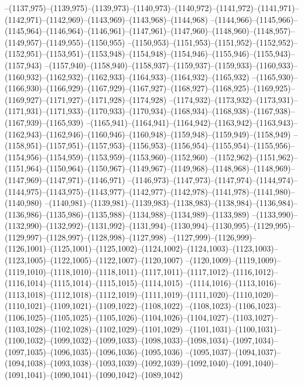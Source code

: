 --(1137,975)--(1139,975)--(1139,973)--(1140,973)--(1140,972)--(1141,972)--(1141,971)--(1142,971)--(1142,969)--(1143,969)--(1143,968)--(1144,968)
--(1144,966)--(1145,966)--(1145,964)--(1146,964)--(1146,961)--(1147,961)--(1147,960)--(1148,960)--(1148,957)--(1149,957)--(1149,955)--(1150,955)
--(1150,953)--(1151,953)--(1151,952)--(1152,952)--(1152,951)--(1153,951)--(1153,948)--(1154,948)--(1154,946)--(1155,946)--(1155,943)--(1157,943)
--(1157,940)--(1158,940)--(1158,937)--(1159,937)--(1159,933)--(1160,933)--(1160,932)--(1162,932)--(1162,933)--(1164,933)--(1164,932)--(1165,932)
--(1165,930)--(1166,930)--(1166,929)--(1167,929)--(1167,927)--(1168,927)--(1168,925)--(1169,925)--(1169,927)--(1171,927)--(1171,928)--(1174,928)
--(1174,932)--(1173,932)--(1173,931)--(1171,931)--(1171,933)--(1170,933)--(1170,934)--(1168,934)--(1168,938)--(1167,938)--(1167,939)--(1165,939)
--(1165,941)--(1164,941)--(1164,942)--(1163,942)--(1163,943)--(1162,943)--(1162,946)--(1160,946)--(1160,948)--(1159,948)--(1159,949)--(1158,949)
--(1158,951)--(1157,951)--(1157,953)--(1156,953)--(1156,954)--(1155,954)--(1155,956)--(1154,956)--(1154,959)--(1153,959)--(1153,960)--(1152,960)
--(1152,962)--(1151,962)--(1151,964)--(1150,964)--(1150,967)--(1149,967)--(1149,968)--(1148,968)--(1148,969)--(1147,969)--(1147,971)--(1146,971)
--(1146,973)--(1147,973)--(1147,974)--(1144,974)--(1144,975)--(1143,975)--(1143,977)--(1142,977)--(1142,978)--(1141,978)--(1141,980)--(1140,980)
--(1140,981)--(1139,981)--(1139,983)--(1138,983)--(1138,984)--(1136,984)--(1136,986)--(1135,986)--(1135,988)--(1134,988)--(1134,989)--(1133,989)
--(1133,990)--(1132,990)--(1132,992)--(1131,992)--(1131,994)--(1130,994)--(1130,995)--(1129,995)--(1129,997)--(1128,997)--(1128,998)--(1127,998)
--(1127,999)--(1126,999)--(1126,1001)--(1125,1001)--(1125,1002)--(1124,1002)--(1124,1003)--(1123,1003)--(1123,1005)--(1122,1005)--(1122,1007)--(1120,1007)
--(1120,1009)--(1119,1009)--(1119,1010)--(1118,1010)--(1118,1011)--(1117,1011)--(1117,1012)--(1116,1012)--(1116,1014)--(1115,1014)--(1115,1015)--(1114,1015)
--(1114,1016)--(1113,1016)--(1113,1018)--(1112,1018)--(1112,1019)--(1111,1019)--(1111,1020)--(1110,1020)--(1110,1021)--(1109,1021)--(1109,1022)--(1108,1022)
--(1108,1023)--(1106,1023)--(1106,1025)--(1105,1025)--(1105,1026)--(1104,1026)--(1104,1027)--(1103,1027)--(1103,1028)--(1102,1028)--(1102,1029)--(1101,1029)
--(1101,1031)--(1100,1031)--(1100,1032)--(1099,1032)--(1099,1033)--(1098,1033)--(1098,1034)--(1097,1034)--(1097,1035)--(1096,1035)--(1096,1036)--(1095,1036)
--(1095,1037)--(1094,1037)--(1094,1038)--(1093,1038)--(1093,1039)--(1092,1039)--(1092,1040)--(1091,1040)--(1091,1041)--(1090,1041)--(1090,1042)--(1089,1042)

